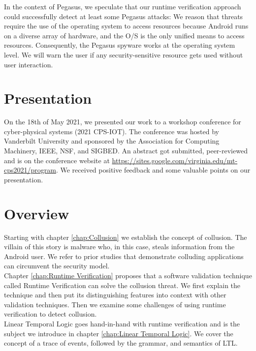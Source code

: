 In the context of Pegasus, we speculate that our runtime verification approach could successfully detect at least some Pegasus attacks:  We reason that threats require the use of the operating system to access resources because Android runs on a diverse array of hardware, and the O/S is the only unified means to access resources.  Consequently, the Pegasus spyware works at the operating system level.  We will warn the user if any security-sensitive resource gets used without user interaction.

\section{Presentation}

On the 18th of May 2021, we presented our work to a workshop conference for cyber-physical systems (2021 CPS-IOT).  The conference was hosted by Vanderbilt University and sponsored by the Association for Computing Machinery, IEEE, NSF, and SIGBED.  An abstract got submitted, peer-reviewed and is on the conference website at \url{https://sites.google.com/virginia.edu/mt-cps2021/program}.  We received positive feedback and some valuable points on our presentation.

\section{Overview}

\noindent Starting with chapter \ref{chap:Collusion} we establish the concept of collusion.  The villain of this story is malware who, in this case, steals information from the Android user.  We refer to prior studies that demonstrate colluding applications can circumvent the security model.\\

\noindent Chapter \ref{chap:Runtime Verification} proposes that a software validation technique called Runtime Verification can solve the collusion threat. We first explain the technique and then put its distinguishing features into context with other validation techniques. Then we examine some challenges of using runtime verification to detect collusion.\\

\noindent Linear Temporal Logic goes hand-in-hand with runtime verification and is the subject we introduce in chapter \ref{chap:Linear Temporal Logic}.  We cover the concept of a trace of events, followed by the grammar, and semantics of LTL.\\

